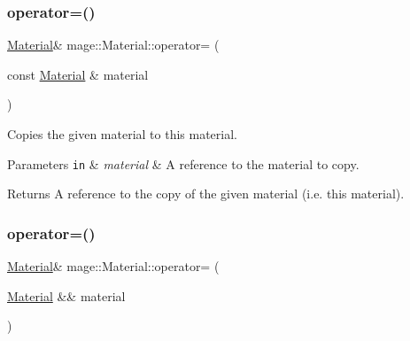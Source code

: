 \hypertarget{structmage_1_1_material_a7ebc9986924ca13ae8468005518dcfc7}{}\label{structmage_1_1_material_a7ebc9986924ca13ae8468005518dcfc7} 
\subsubsection{\texorpdfstring{operator=()}{operator=()}\hspace{0.1cm}{\footnotesize\ttfamily [1/2]}}
{\footnotesize\ttfamily \hyperlink{structmage_1_1_material}{Material}\& mage\+::\+Material\+::operator= (\begin{DoxyParamCaption}\item[{const \hyperlink{structmage_1_1_material}{Material} \&}]{material }\end{DoxyParamCaption})\hspace{0.3cm}{\ttfamily [default]}}

Copies the given material to this material.


\begin{DoxyParams}[1]{Parameters}
\mbox{\tt in}  & {\em material} & A reference to the material to copy. \\
\hline
\end{DoxyParams}
\begin{DoxyReturn}{Returns}
A reference to the copy of the given material (i.\+e. this material). 
\end{DoxyReturn}
\hypertarget{structmage_1_1_material_a500a2ebe99d4d7b3be5bf57b6bff62a1}{}\label{structmage_1_1_material_a500a2ebe99d4d7b3be5bf57b6bff62a1} 
\subsubsection{\texorpdfstring{operator=()}{operator=()}\hspace{0.1cm}{\footnotesize\ttfamily [2/2]}}
{\footnotesize\ttfamily \hyperlink{structmage_1_1_material}{Material}\& mage\+::\+Material\+::operator= (\begin{DoxyParamCaption}\item[{\hyperlink{structmage_1_1_material}{Material} \&\&}]{material }\end{DoxyParamCaption})\hspace{0.3cm}{\ttfamily [default]}}

